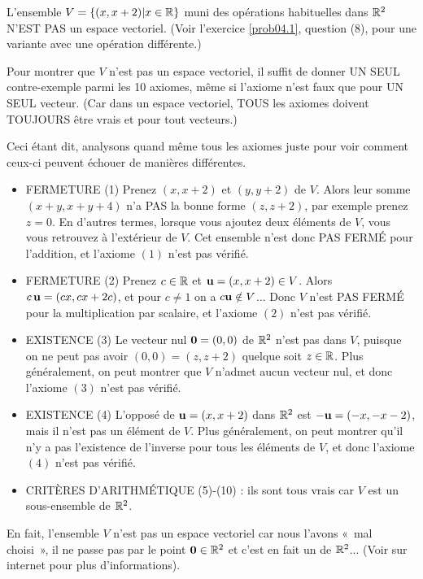 \begin{myexample} L'ensemble $V = \{(x,x+2) | x\in \mathbb{R}\}$ muni des opérations habituelles dans $\mathbb{R}^2$ N'EST PAS un espace vectoriel. (Voir l'exercice \ref{prob04.1}, question (8), pour une variante avec une opération différente.)

Pour montrer que $V$ n'est pas un espace vectoriel, il suffit de donner UN SEUL contre-exemple parmi les 10 axiomes, m\^eme si l'axiome n'est faux que pour UN SEUL vecteur.
(Car dans un espace vectoriel, TOUS les axiomes doivent TOUJOURS être vrais et pour tout vecteurs.)

Ceci étant dit, analysons quand même tous les axiomes juste pour voir comment ceux-ci peuvent échouer de manières différentes.
 
\begin{itemize}
\item FERMETURE (1) Prenez $(x,x+2)$ et $(y,y+2)$ de $V$.  Alors leur somme 
$(x+y, x+y+4)$ n'a PAS la bonne forme $(z,z+2)$, par exemple prenez $z=0$.  En d'autres termes, lorsque vous ajoutez deux éléments de $V$, vous vous retrouvez à l'extérieur de $V$.  Cet ensemble n'est donc PAS FERMÉ pour l'addition, et l'axiome $(1)$ n'est pas vérifié.
\item FERMETURE (2) Prenez $c\in\mathbb{R}$ et $\mathbf{u} = (x,x+2)\in V$.  Alors $c\,\mathbf{u} = (cx, cx+2c)$, et pour $c\neq 1$ on a $c\mathbf{u} \notin V$... Donc  $V$ n'est PAS FERMÉ pour la multiplication par scalaire, et l'axiome $(2)$ n'est pas vérifié.
\item EXISTENCE (3) Le vecteur nul $\mathbf{0}=(0,0)$ de $\mathbb{R}^2$ n'est pas dans $V$, puisque 
on ne peut pas avoir $(0,0) = (z,z+2)$ quelque soit $z\in \mathbb{R}$. Plus généralement, on peut montrer que $V$ n'admet aucun vecteur nul, et donc l'axiome $(3)$ n'est pas vérifié.
\item EXISTENCE (4) L'oppos\'e de $\mathbf{u} = (x,x+2)$ dans $\mathbb{R}^2$ est $-\mathbf{u} = (-x,-x-2)$, mais il n'est pas un \'el\'ement de $V$. Plus généralement, on peut montrer qu'il n'y a pas l'existence de l'inverse pour tous les éléments de $V$, et donc l'axiome $(4)$ n'est pas vérifié.
\item CRIT\`ERES D'ARITHM\'ETIQUE (5)-(10) : 
ils sont tous vrais car $V$ est un sous-ensemble de $\mathbb{R}^2$.
\end{itemize} 
En fait, l'ensemble $V$ n'est pas un espace vectoriel car nous l'avons «~mal choisi~», il ne passe pas par le point $\mathbf{0}\in\mathbb{R}^2$ et c'est en fait un  de $\mathbb{R}^2$... (Voir sur internet pour plus d'informations).
\end{myexample}

